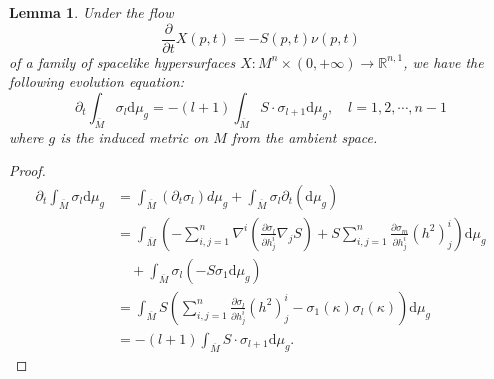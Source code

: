 \documentclass[10pt,a4paper]{amsart}
\newtheorem{lemma}[theorem]{Lemma}
\newcommand{\dd}{\ensuremath{\text{d}}}
\newcommand{\R}{\ensuremath{\mathbb{R}}}
\newcommand{\pd}[2]{\frac{\partial {#1}}{\partial {#2}}}
\numberwithin{equation}{section}
\begin{document}
\begin{lemma}\label{eq:evolution_integral_sigma_l}
    Under the flow 
    \begin{equation}\label{eq:inverse_sigma_k_flow}
        \pd{}{t}X(p,t) = -S(p,t)\nu(p,t)
    \end{equation}
    of a family of spacelike hypersurfaces \(X : M^n\times (0,+\infty) \to \R^{n,1}\), we have the following evolution equation: 
    \begin{equation}
        \partial_t \int_{\overline{M}} \sigma_l \dd \mu_g = -(l+1)\int_{\overline{M}} S\cdot \sigma_{l+1} \dd \mu_g,\quad l=1,2,\cdots,n-1
    \end{equation}
    where \(g\) is the induced metric on \(M\) from the ambient space. 
\end{lemma}
\begin{proof}
    \begin{equation}
        \begin{aligned}
            \partial_t \int_{\overline{M}} \sigma_l \dd \mu_g &= \int_{\overline{M}} (\partial_t \sigma_l) d\mu_g + \int_{\overline{M}} \sigma_l \partial_t(\dd \mu_g) \\
            &= \int_{\overline{M}} \left( -\sum_{i,j=1}^{n}\nabla^i \left(\pd{\sigma_l}{h_j^i}\nabla_j S\right) + S\sum_{i,j=1}^{n} \pd{\sigma_m}{h_j^i}(h^2)_j^i \right) \dd \mu_g \\
            &\quad + \int_{\overline{M}} \sigma_l(-S\sigma_1 \dd \mu_g) \\
            &= \int_{\overline{M}} S\left( \sum_{i,j=1}^{n} \pd{\sigma_l}{h_j^i}(h^2)_j^i - \sigma_1(\kappa)\sigma_l(\kappa) \right)\dd \mu_g \\
            &= -(l+1)\int_{\overline{M}} S\cdot \sigma_{l+1}\dd \mu_g.
        \end{aligned}
    \end{equation}
\end{proof}
\end{document}
